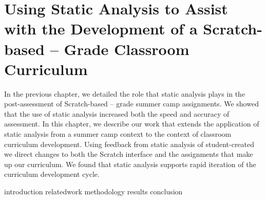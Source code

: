 \chapter{Using Static Analysis to Assist with the Development of a
  Scratch-based -- Grade Classroom Curriculum}
\label{chap:curriculum}

\def\currentprefix{curriculum}

In the previous chapter, we detailed the role that static analysis plays in the
post-assessment of Scratch-based -- grade summer camp
assignments. We showed that the use of static analysis increased both the speed
and accuracy of assessment. In this chapter, we describe our work that extends
the application of static analysis from a summer camp context to the context of
classroom curriculum development. Using feedback from static analysis of
student-created  we direct changes to both the Scratch interface
and the assignments that make up our curriculum. We found that static analysis
supports rapid iteration of the curriculum development cycle.

\iffull
{introduction}
{relatedwork}
{methodology}
{results}
{conclusion}
\fi
